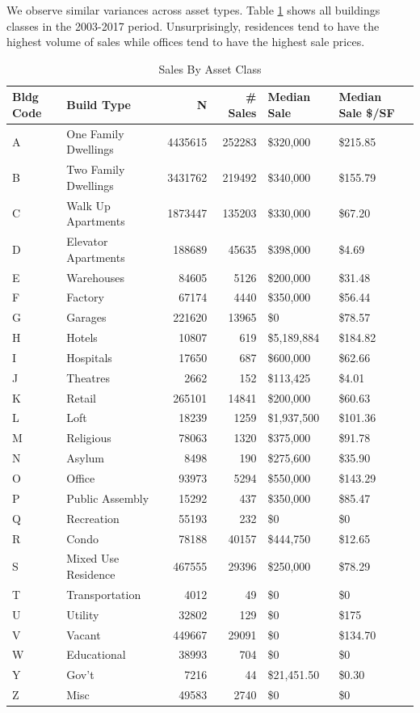 \documentclass[conference,final,]{IEEEtran}
\begin{document}
We observe similar variances across asset types. Table
\ref{tab:by_class} shows all buildings classes in the 2003-2017 period.
Unsurprisingly, residences tend to have the highest volume of sales
while offices tend to have the highest sale prices.

\begin{table}

\caption{\label{tab:by_class}\label{tab:by_class} Sales By Asset Class}
\centering
\begin{tabular}[t]{l|l|r|r|l|l}
\hline
Bldg Code & Build Type & N & \# Sales & Median Sale & Median Sale \$/SF\\
\hline
A & One Family Dwellings & 4435615 & 252283 & \$320,000 & \$215.85\\
\hline
B & Two Family Dwellings & 3431762 & 219492 & \$340,000 & \$155.79\\
\hline
C & Walk Up Apartments & 1873447 & 135203 & \$330,000 & \$67.20\\
\hline
D & Elevator Apartments & 188689 & 45635 & \$398,000 & \$4.69\\
\hline
E & Warehouses & 84605 & 5126 & \$200,000 & \$31.48\\
\hline
F & Factory & 67174 & 4440 & \$350,000 & \$56.44\\
\hline
G & Garages & 221620 & 13965 & \$0 & \$78.57\\
\hline
H & Hotels & 10807 & 619 & \$5,189,884 & \$184.82\\
\hline
I & Hospitals & 17650 & 687 & \$600,000 & \$62.66\\
\hline
J & Theatres & 2662 & 152 & \$113,425 & \$4.01\\
\hline
K & Retail & 265101 & 14841 & \$200,000 & \$60.63\\
\hline
L & Loft & 18239 & 1259 & \$1,937,500 & \$101.36\\
\hline
M & Religious & 78063 & 1320 & \$375,000 & \$91.78\\
\hline
N & Asylum & 8498 & 190 & \$275,600 & \$35.90\\
\hline
O & Office & 93973 & 5294 & \$550,000 & \$143.29\\
\hline
P & Public Assembly & 15292 & 437 & \$350,000 & \$85.47\\
\hline
Q & Recreation & 55193 & 232 & \$0 & \$0\\
\hline
R & Condo & 78188 & 40157 & \$444,750 & \$12.65\\
\hline
S & Mixed Use Residence & 467555 & 29396 & \$250,000 & \$78.29\\
\hline
T & Transportation & 4012 & 49 & \$0 & \$0\\
\hline
U & Utility & 32802 & 129 & \$0 & \$175\\
\hline
V & Vacant & 449667 & 29091 & \$0 & \$134.70\\
\hline
W & Educational & 38993 & 704 & \$0 & \$0\\
\hline
Y & Gov't & 7216 & 44 & \$21,451.50 & \$0.30\\
\hline
Z & Misc & 49583 & 2740 & \$0 & \$0\\
\hline
\end{tabular}
\end{table}
\end{document}
